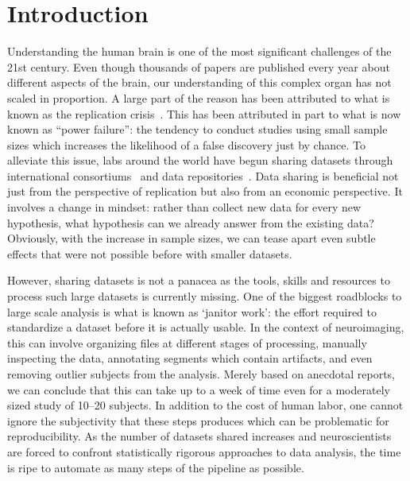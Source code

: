 \chapter{Introduction}

Understanding the human brain is one of the most significant challenges of the 21st century. Even though thousands of papers are published every year about different aspects of the brain, our understanding of this complex organ has not scaled in proportion. A large part of the reason has been attributed to what is known as the replication crisis~\citep{ioannidis2005most, simmons2011false, button2013power}. This has been attributed in part to what is now known as ``power failure'': the tendency to conduct studies using small sample sizes which increases the likelihood of a false discovery just by chance. To alleviate this issue, labs around the world have begun sharing datasets through international consortiums~\citep{van2013wu, ollier2005uk} and data repositories~\citep{poldrack2013toward, gorgolewski2015neurovault}. Data sharing is beneficial not just from the perspective of replication but also from an economic perspective. It involves a change in mindset: rather than collect new data for every new hypothesis, what hypothesis can we already answer from the existing data? Obviously, with the increase in sample sizes, we can tease apart even subtle effects that were not possible before with smaller datasets.

However, sharing datasets is not a panacea as the tools, skills and resources to process such large datasets is currently missing. One of the biggest roadblocks to large scale analysis is what is known as `janitor work': the effort required to standardize a dataset before it is actually usable. In the context of neuroimaging, this can involve organizing files at different stages of processing, manually inspecting the data, annotating segments which contain artifacts, and even removing outlier subjects from the analysis. Merely based on anecdotal reports, we can conclude that this can take up to a week of time even for a moderately sized study of 10--20 subjects.
In addition to the cost of human labor, one cannot ignore the subjectivity that these steps produces which can be problematic for reproducibility. As the number of datasets shared increases and neuroscientists are forced to confront statistically rigorous approaches to data analysis, the time is ripe to automate as many steps of the pipeline as possible.

